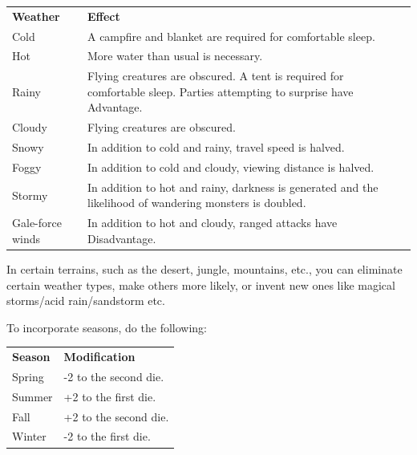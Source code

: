 \documentclass[twoside]{article}
\begin{document}
\begin{center}
\noindent\begin{tabular}{>{\centering\arraybackslash}p{}p{}}
\textbf{Weather}&\textbf{Effect}\\
\rowcolor[gray]{0.75}Cold&A campfire and blanket are required for comfortable sleep.\\
Hot&More water than usual is necessary.\\
\rowcolor[gray]{0.75}Rainy&Flying creatures are obscured. A tent is required for comfortable sleep. Parties attempting to surprise have Advantage.\\
Cloudy&Flying creatures are obscured.\\
\rowcolor[gray]{0.75}Snowy&In addition to cold and rainy, travel speed is halved.\\
Foggy&In addition to cold and cloudy, viewing distance is halved.\\
\rowcolor[gray]{0.75}Stormy&In addition to hot and rainy, darkness is generated and the likelihood of wandering monsters is doubled.\\
Gale-force winds&In addition to hot and cloudy, ranged attacks have Disadvantage.\\
\end{tabular}
\end{center}

\bigbreak

In certain terrains, such as the desert, jungle, mountains, etc., you can eliminate certain weather types, make others more likely, or invent new ones like magical storms/acid rain/sandstorm etc.

\bigbreak

To incorporate seasons, do the following:

\bigbreak

\begin{center}
\noindent\begin{tabular}{>{\centering\arraybackslash}p{}p{}}
\textbf{Season}&\textbf{Modification}\\
\rowcolor[gray]{0.75}Spring&-2 to the second die.\\
Summer&+2 to the first die.\\
\rowcolor[gray]{0.75}Fall&+2 to the second die.\\
Winter&-2 to the first die.\\
\end{tabular}
\end{center}
\end{document}
